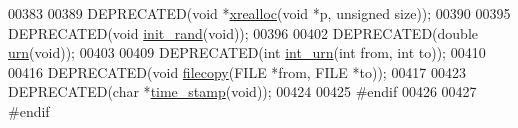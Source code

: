 \begin{DoxyCode}
00383 
00389 DEPRECATED(\textcolor{keywordtype}{void} *\hyperlink{utils_8h_a9037ada838835b1b9db41581a021b0c8}{xrealloc}(\textcolor{keywordtype}{void} *p, \textcolor{keywordtype}{unsigned} size));
00390 
00395 DEPRECATED(\textcolor{keywordtype}{void} \hyperlink{utils_8h_a8aaa6d9be6f803f496d9b97375c371f3}{init\_rand}(\textcolor{keywordtype}{void}));
00396 
00402 DEPRECATED(\textcolor{keywordtype}{double} \hyperlink{utils_8h_aaa328491c84996e445d027fde9800f2e}{urn}(\textcolor{keywordtype}{void}));
00403 
00409 DEPRECATED(\textcolor{keywordtype}{int} \hyperlink{utils_8h_a68ff0849d44f62fe491800378a5ffcb4}{int\_urn}(\textcolor{keywordtype}{int} from, \textcolor{keywordtype}{int} to));
00410 
00416 DEPRECATED(\textcolor{keywordtype}{void} \hyperlink{utils_8h_ab213334ce977b6d21611cdea6b80c3bf}{filecopy}(FILE *from, FILE *to));
00417 
00423 DEPRECATED(\textcolor{keywordtype}{char} *\hyperlink{utils_8h_a7afeb906cb36e9d77379eabc6907ac46}{time\_stamp}(\textcolor{keywordtype}{void}));
00424 
00425 \textcolor{preprocessor}{#endif}
00426 
00427 \textcolor{preprocessor}{#endif}
\end{DoxyCode}
